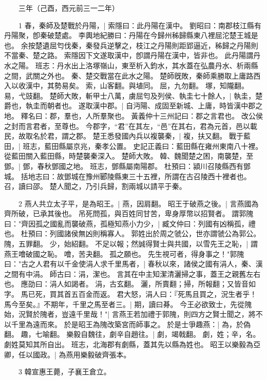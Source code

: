 　　三年（己酉，西元前三一二年）

　　1 春，秦師及楚戰於丹陽，|{
	索隱曰：此丹陽在漢中。
	劉昭曰：南郡枝江縣有丹陽聚，卽秦破楚處。
	李輿地紀勝曰：丹陽在今歸州秭歸縣東八裡屈沱楚王城是也。
	余按楚遺屈匄伐秦，秦發兵逆擊之，枝江之丹陽則距郢逼近，秭歸之丹陽則不當秦、楚之路。
	索隱因下文遂取漢中，卽謂丹陽在漢中，皆非也。
	此丹陽謂丹水之陽。
	班志：丹水出上洛塚嶺山，東至析入鈞水，其水蓋在弘農丹水、析兩縣之間，武關之外也。
	秦、楚交戰當在此水之陽。
	楚師旣敗，秦師乘勝取上庸路西入以收漢中，其勢易矣。
	索，山客翻。與埴同。
	屈，九勿翻。
	塚，知隴翻。
	易，弋豉翻。
}
楚師大敗，斬甲士八萬，虜屈匄及列侯、執圭七十餘人，|{
	執圭，楚爵也，執圭而朝者也。
}
遂取漢中郡。|{
	自沔陽、成固至新城、上庸，時皆漢中郡之地。
	釋名曰：郡，羣也，人所羣聚也。
	黃義仲十三州記曰：郡之言君也。
	改公侯之封而言君者，至尊也。
	今郡字，“君”在其左，“邑”在其右，君為元首，邑以載民，故取名於君，謂之郡。
}
楚王悉發國內兵以複襲秦，|{
	複，扶又翻。
}
戰于藍田，|{
	班志，藍田縣屬京兆，秦孝公置。
	史記正義曰：藍田縣在雍州東南八十裡。
	從藍田關入藍田縣，時楚襲秦深入。
}
楚師大敗。
	韓、魏聞楚之困，南襲楚，至鄧。|{
	鄧，春秋鄧國之地。
	班志，鄧縣屬南陽郡。
	杜預曰：潁川召陵縣西有鄧城。
	括地志曰：故鄧城在豫州郾陵縣東三十五裡，所謂在古召陵西十裡者也。
	召，讀曰邵。
}
楚人聞之，乃引兵歸，割兩城以請平于秦。


　　2 燕人共立太子平，是為昭王。|{
	燕，因肩翻。
}
昭王于破燕之後。|{
	言燕國為齊所破，已承其後也。
}
吊死問孤，與百姓同甘苦，卑身厚幣以招賢者。
	謂郭隗曰："齊因孤之國亂而襲破燕，孤極知燕小力少，|{
	臧文仲曰：列國有凶稱孤，禮也。
	杜預曰：列國諸侯無凶則稱寡人。
	郭姓出於周之虢公，世亦謂虢公為郭公。
	隗，五罪翻。
	少，始紹翻。
}
不足以報；然誠得賢士與共國，以雪先王之恥，|{
	謂燕王噲破國之恥。
	噲，苦夬翻。
}
孤之願也。
	先生視可者，得身事之！"郭隗曰："古之人君有以千金使涓人求千里馬者，|{
	春秋以來，諸侯之國有涓人，秦、漢之間有中涓。
	師古曰：涓，潔也。
	言其在中主知潔清灑掃之事，蓋王之親舊左右也。
	應劭曰：涓人如謁者。
	涓，古玄翻。
	灑，所賣翻；掃，所報翻；又皆音如字。
}
馬已死，買其首五百金而返。
	君大怒，涓人曰：『死馬且買之，況生者乎！馬今至矣。』不期年，千里之馬至者三。|{
	期，讀曰朞。
}
今王必欲致士，先從隗始，況賢於隗者，豈遠千里哉！"|{
	言燕王若加禮于郭隗，則四方之賢士聞之，將不以千里為遠而來。
}
於是昭王為隗改築宮而師事之。
	於是士爭趣燕：|{
	為，於偽翻。
	趣，七喻翻。
}
樂毅自魏往，劇辛自趙往。|{
	劇，竭戟翻。
	劇，姓；辛，名。
	劇姓莫知其所自出。
	班志，北海郡有劇縣，蓋其先以縣為姓也。
}
昭王以樂毅為亞卿，任以國政。|{
	為燕用樂毅破齊張本。
}

　　3 韓宣惠王薨，子襄王倉立。


